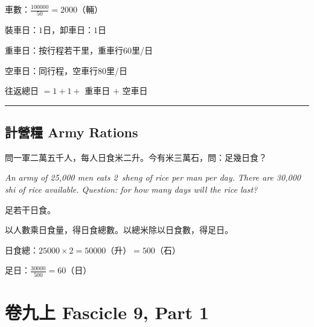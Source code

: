 \documentclass[11pt,a4paper]{article}
\newcommand{\longline}{\noindent\rule{\textwidth}{0.4pt}}
\begin{document}
\begin{working}
車數：$\displaystyle\frac{100000}{50} = 2000$（輛）

裝車日：$1$日，卸車日：$1$日

重車日：按行程若干里，重車行$60$里/日

空車日：同行程，空車行$80$里/日

往返總日 $= 1 + 1 +$ 重車日 $+$ 空車日
\end{working}

\vspace{0.5em}
\longline

\subsection{計營糧 \quad Army Rations}

\begin{problem}
問一軍二萬五千人，每人日食米二升。今有米三萬石，問：足幾日食？

\textit{An army of 25{,}000 men eats 2~sheng of rice per man per day. There are 30{,}000 shi of rice available. Question: for how many days will the rice last?}
\end{problem}

\begin{answer}
足若干日食。
\end{answer}

\begin{method}
以人數乘日食量，得日食總數。以總米除以日食數，得足日。
\end{method}

\begin{working}
日食總：$25000 \times 2 = 50000$（升）$= 500$（石）

足日：$\displaystyle\frac{30000}{500} = 60$（日）
\end{working}

\newpage

\section{卷九上 \quad Fascicle 9, Part 1}
\label{sec:fasc9a}

\begin{center}
\end{center}
\end{document}
